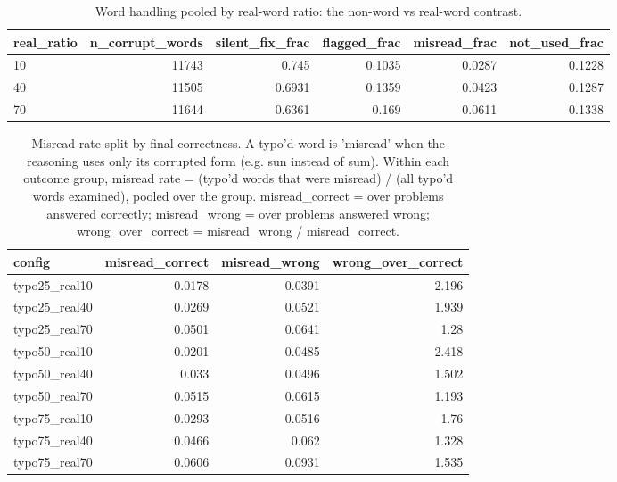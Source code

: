 \documentclass[11pt]{article}
\begin{document}
\begin{table}[H]
\centering
\caption{Word handling pooled by real-word ratio: the non-word vs real-word contrast.}
\small
\begin{adjustbox}{max width=\textwidth}
\begin{tabular}{lrrrrr}
\toprule
\textbf{real\_ratio} & \textbf{n\_corrupt\_words} & \textbf{silent\_fix\_frac} & \textbf{flagged\_frac} & \textbf{misread\_frac} & \textbf{not\_used\_frac} \\
\midrule
10 & 11743 & 0.745 & 0.1035 & 0.0287 & 0.1228 \\
40 & 11505 & 0.6931 & 0.1359 & 0.0423 & 0.1287 \\
70 & 11644 & 0.6361 & 0.169 & 0.0611 & 0.1338 \\
\bottomrule
\end{tabular}
\end{adjustbox}
\end{table}

\begin{table}[H]
\centering
\caption{Misread rate split by final correctness. A typo'd word is 'misread' when the reasoning uses only its corrupted form (e.g. sun instead of sum). Within each outcome group, misread rate = (typo'd words that were misread) / (all typo'd words examined), pooled over the group. misread\_correct = over problems answered correctly; misread\_wrong = over problems answered wrong; wrong\_over\_correct = misread\_wrong / misread\_correct.}
\small
\begin{adjustbox}{max width=\textwidth}
\begin{tabular}{lrrr}
\toprule
\textbf{config} & \textbf{misread\_correct} & \textbf{misread\_wrong} & \textbf{wrong\_over\_correct} \\
\midrule
typo25\_real10 & 0.0178 & 0.0391 & 2.196 \\
typo25\_real40 & 0.0269 & 0.0521 & 1.939 \\
typo25\_real70 & 0.0501 & 0.0641 & 1.28 \\
typo50\_real10 & 0.0201 & 0.0485 & 2.418 \\
typo50\_real40 & 0.033 & 0.0496 & 1.502 \\
typo50\_real70 & 0.0515 & 0.0615 & 1.193 \\
typo75\_real10 & 0.0293 & 0.0516 & 1.76 \\
typo75\_real40 & 0.0466 & 0.062 & 1.328 \\
typo75\_real70 & 0.0606 & 0.0931 & 1.535 \\
\bottomrule
\end{tabular}
\end{adjustbox}
\end{table}
\end{document}
